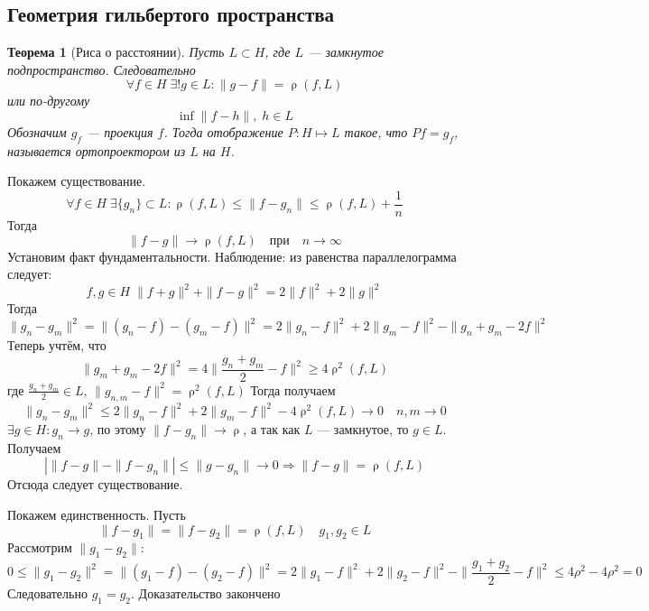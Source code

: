 \documentclass[12pt]{article}
\DeclareMathOperator{\rh}{\rho}
\begin{document}
\subsection*{Геометрия гильбертого пространства}
\newtheorem{Th1}{Теорема}
\begin{Th1}[Риса о расстоянии]
    Пусть $L \subset H$, где $L$ --- замкнутое подпространство.
    Следовательно
    $$
    \forall f \in H\; \exists! g \in L\colon \|g - f\| = \rh(f, L)
    $$ 
    или по-другому 
    $$
    \inf\|f - h\|, \;h\in L
    $$
    Обозначим $g_f$ --- проекция $f$.
    Тогда отображение $P:H \mapsto L$ такое, что $Pf = g_f$, называется ортопроектором из $L$ на $H$.
\end{Th1}
\begin{Proof}
    Покажем существование.
    $$
    \forall f \in H\;\exists \{g_n\} \subset L\colon \rh(f, L) \le \|f-g_n\| \le \rh(f,L) + \frac{1}{n}
    $$
    Тогда
    $$
    \|f - g\| \to \rh(f,L)\quad \text{при} \quad n \to \infty
    $$
    Установим факт фундаментальности.
    Наблюдение: из равенства параллелограмма следует:
    $$
    f, g\in H\;\|f + g\|^2 + \|f - g\|^2 = 2\|f\|^2 + 2\|g\|^2
    $$
    Тогда
    $$
    \|g_n - g_m\|^2 = \|(g_n - f) - (g_m - f)\|^2 = 2\|g_n - f\|^2 + 2\|g_m - f\|^2 - \|g_n + g_m - 2f\|^2
    $$
    Теперь учтём, что
    $$
    \|g_m+g_m-2f\|^2 = 4\|\frac{g_n + g_m}{2} - f\|^2 \ge 4\rh^2(f, L)
    $$
    где $\frac{g_n + g_m}{2} \in L$, $\|g_{n,m} - f\|^2 = \rh^2(f, L)$
    Тогда получаем
    $$
    \|g_n - g_m\|^2 \le 2\|g_n - f\|^2 + 2\|g_m - f\|^2 - 4\rh^2(f,L) \to 0 \quad n,m \to 0
    $$
    $\exists g \in H\colon g_n \to g$, по этому $\|f - g_n\| \to \rh$, а так как $L$ --- замкнутое, то $g \in L$.
    Получаем 
    $$
    |\|f - g\| - \|f - g_n\|| \le \|g - g_n\| \to 0 \Rightarrow \|f-g\| = \rh(f,L)
    $$
    Отсюда следует существование.
    
    Покажем единственность.
    Пусть
    $$
    \|f - g_1\| = \|f - g_2\| = \rh(f, L)\quad g_1, g_2 \in L
    $$
    Рассмотрим $\|g_1 - g_2\|$:
    $$
    0 \le \|g_1 - g_2\|^2 = \|(g_1 - f) - (g_2 - f)\|^2 = 2\|g_1 - f\|^2 + 2\|g_2 - f\|^2 - \|\frac{g_1 + g_2}{2} - f\|^2 \le 4\rho^2 - 4\rho^2 = 0
    $$
    Следовательно $g_1 = g_2$.
    Доказательство закончено
\end{Proof}
\end{document}
